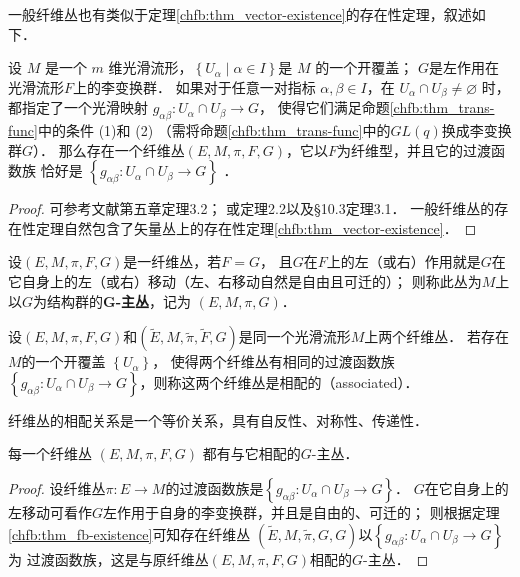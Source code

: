 一般纤维丛也有类似于定理\ref{chfb:thm_vector-existence}的存在性定理，叙述如下．

\begin{theorem}\label{chfb:thm_fb-existence}
    设 $M$ 是一个 $m$ 维光滑流形，$\left\{U_\alpha\mid \alpha \in I\right\}$是 $M$ 的一个开覆盖；
    $G$是左作用在光滑流形$F$上的李变换群．
    如果对于任意一对指标 $\alpha, \beta \in I$，在 $U_\alpha \cap U_\beta \neq \varnothing$ 时，
    都指定了一个光滑映射 $g_{\alpha \beta}: U_\alpha \cap U_\beta \rightarrow G$，
    使得它们满足命题\ref{chfb:thm_trans-func}中的条件 (1)和 (2)
    （需将命题\ref{chfb:thm_trans-func}中的$GL(q)$换成李变换群$G$）．
    那么存在一个纤维丛$(E,M,\pi,F,G)$，它以$F$为纤维型，并且它的过渡函数族
    恰好是 $\left\{g_{\alpha \beta}: U_\alpha \cap U_\beta \rightarrow G\right\}$ ．
\end{theorem}

\begin{proof}
    可参考文献\parencite{Husemoller-1994}第五章定理3.2；
    或\parencite[\S 10.2]{chen-li-2026-2ed-v2}定理2.2以及\S 10.3定理3.1．
    一般纤维丛的存在性定理自然包含了矢量丛上的存在性定理\ref{chfb:thm_vector-existence}．
\end{proof}



\begin{definition}
    设$(E, M, \pi, F, G)$是一纤维丛，若$F=G$，
    且$G$在$F$上的左（或右）作用就是$G$在它自身上的左（或右）移动（左、右移动自然是自由且可迁的）；
    则称此丛为$M$上以$G$为结构群的{\heiti \bfseries G-主丛}，记为 $(E, M, \pi, G)$．
\end{definition} 

\begin{definition}\label{chfb:def_associated}
    设$(E, M, \pi, F, G)$和$(\widetilde{E}, M, \tilde{\pi}, \widetilde{F}, G)$是同一个光滑流形$M$上两个纤维丛．
    若存在$M$的一个开覆盖 $\left\{U_\alpha\right\}$，
    使得两个纤维丛有相同的过渡函数族$\left\{g_{\alpha \beta}:
    U_\alpha \cap U_\beta \rightarrow G\right\}$，则称这两个纤维丛是{\heiti 相配的}（associated）．
\end{definition} 

纤维丛的相配关系是一个等价关系，具有自反性、对称性、传递性．

\begin{proposition}
    每一个纤维丛 $(E, M, \pi, F, G)$ 都有与它相配的$G$-主丛．
\end{proposition} 
\begin{proof}
    设纤维丛$\pi: E \rightarrow M$的过渡函数族是$\left\{g_{\alpha \beta}: U_\alpha \cap U_\beta \rightarrow G\right\}$．
    $G$在它自身上的左移动可看作$G$左作用于自身的李变换群，并且是自由的、可迁的；
    则根据定理\ref{chfb:thm_fb-existence}可知存在纤维丛
    $(\widetilde{E}, M, \tilde{\pi},G, G)$以$\left\{g_{\alpha \beta}: U_\alpha \cap U_\beta \rightarrow G\right\}$为
    过渡函数族，这是与原纤维丛$(E, M, \pi, F, G)$相配的$G$-主丛．
\end{proof}

